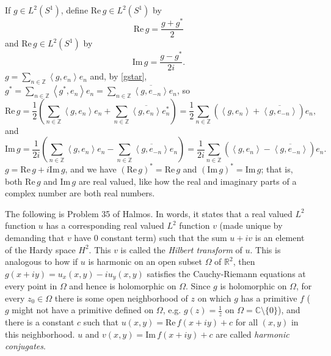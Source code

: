 \documentclass{article}
\newcommand{\inner}[2]{\left\langle #1, #2 \right\rangle}
\def\Re{\ensuremath{\mathrm{Re}}\,}
\def\Im{\ensuremath{\mathrm{Im}}\,}
\begin{document}
If $g \in L^2(S^1)$, define $\Re g \in L^2(S^1)$ by
\[
\Re g = \frac{g+g^*}{2}
\]
and $\Re g \in L^2(S^1)$ by
\[
\Im g = \frac{g-g^*}{2i}.
\]
$g = \sum_{n \in \mathbb{Z}} \inner{g}{e_n} e_n$ and, by \eqref{gstar}, $g^*=\sum_{n \in \mathbb{Z}} \inner{g^*}{e_n}e_n=\sum_{n \in \mathbb{Z}} \overline{\inner{g}{e_{-n}}} e_n$, so
\[
\Re g = \frac{1}{2} \left( \sum_{n \in \mathbb{Z}}  \inner{g}{e_n} e_n + \sum_{n \in \mathbb{Z}} \overline{\inner{g}{e_n}} e_n^* \right)
=\frac{1}{2} \sum_{n \in \mathbb{Z}} \left(  \inner{g}{e_n} +  \overline{\inner{g}{e_{-n}}} \right) e_n,
\]
and
\begin{equation}
\Im g = \frac{1}{2i} \left(  \sum_{n \in \mathbb{Z}} \inner{g}{e_n} e_n  -\sum_{n \in \mathbb{Z}} \overline{\inner{g}{e_{-n}}} e_n\right)
=\frac{1}{2i} \sum_{n \in \mathbb{Z}} \left(  \inner{g}{e_n} -  \overline{\inner{g}{e_{-n}}}\right) e_n.
\label{imfourier}
\end{equation}
$g = \Re g + i \Im g$, and we have $(\Re g)^*=\Re g$ and $(\Im g)^*=\Im g$; that is, both $\Re g$ and $\Im g$ are real valued, like how the real and imaginary parts of a complex number are both real numbers.


The following is Problem 35 of Halmos. In words, it states that a real valued $L^2$ function $u$ has a corresponding real valued $L^2$ function  $v$
(made unique by demanding that $v$ have $0$ constant term) such that the sum $u+iv$ is an element of the Hardy space $H^2$. This $v$ is called
the {\em Hilbert transform} of $u$. This is analogous to how if $u$ is
harmonic on an open subset $\Omega$ of $\mathbb{R}^2$, then $g(x+iy)=u_x(x,y)-iu_y(x,y)$ satisfies the Cauchy-Riemann equations at every point in $\Omega$ 
and hence is holomorphic on $\Omega$. Since $g$ is holomorphic on $\Omega$, for every $z_0 \in \Omega$ there is some open neighborhood of $z$ on which $g$ has a primitive
$f$ ($g$ might not have a primitive defined on $\Omega$, e.g. $g(z)=\frac{1}{z}$ on $\Omega=\mathbb{C} \setminus \{0\}$), and there is a constant $c$ such that $u(x,y)=\Re f(x+iy)+c$
for
all $(x,y)$ in this neighborhood. $u$ and $v(x,y)=\Im f(x+iy)+c$ are called {\em harmonic conjugates}.
\end{document}
